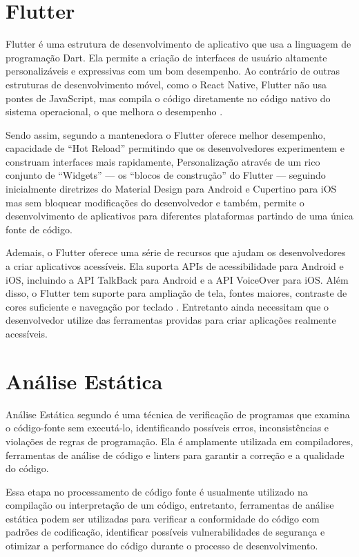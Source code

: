 \section{Flutter}

Flutter é uma estrutura de desenvolvimento de aplicativo que usa a linguagem de programação Dart. Ela permite a criação de interfaces de usuário altamente personalizáveis e expressivas com um bom desempenho. Ao contrário de outras estruturas de desenvolvimento móvel, como o React Native, Flutter não usa pontes de JavaScript, mas compila o código diretamente no código nativo do sistema operacional, o que melhora o desempenho \cite{flutter}.

Sendo assim, segundo a mantenedora o Flutter oferece melhor desempenho, capacidade de “Hot Reload” permitindo que os desenvolvedores experimentem e construam interfaces mais rapidamente, Personalização através de um rico conjunto de “Widgets” --- os “blocos de construção” do Flutter --- seguindo inicialmente diretrizes do Material Design para Android e Cupertino para iOS mas sem bloquear modificações do desenvolvedor e também, permite o desenvolvimento de aplicativos para diferentes plataformas partindo de uma única fonte de código.

Ademais, o Flutter oferece uma série de recursos que ajudam os desenvolvedores a criar aplicativos acessíveis. Ela suporta APIs de acessibilidade para Android e iOS, incluindo a API TalkBack para Android e a API VoiceOver para iOS. Além disso, o Flutter tem suporte para ampliação de tela, fontes maiores, contraste de cores suficiente e navegação por teclado \cite{flutter}. Entretanto ainda necessitam que o desenvolvedor utilize das ferramentas providas para criar aplicações realmente acessíveis.

\section{Análise Estática}

Análise Estática segundo \cite{interpreters} é uma técnica de verificação de programas que examina o código-fonte sem executá-lo, identificando possíveis erros, inconsistências e violações de regras de programação. Ela é amplamente utilizada em compiladores, ferramentas de análise de código e linters para garantir a correção e a qualidade do código.

Essa etapa no processamento de código fonte é usualmente utilizado na compilação ou interpretação de um código, entretanto, ferramentas de análise estática podem ser utilizadas para verificar a conformidade do código com padrões de codificação, identificar possíveis vulnerabilidades de segurança e otimizar a performance do código durante o processo de desenvolvimento.

